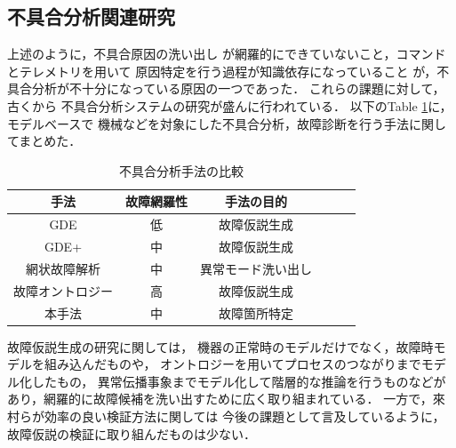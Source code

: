 \documentclass[11pt]{report}
\begin{document}


\subsection{不具合分析関連研究}
上述のように，不具合原因の洗い出し
が網羅的にできていないこと，コマンドとテレメトリを用いて
原因特定を行う過程が知識依存になっていること
が，不具合分析が不十分になっている原因の一つであった．%
これらの課題に対して，古くから%
不具合分析システムの研究が盛んに行われている．
以下のTable \ref{tab:previous_research}に，モデルベースで
機械などを対象にした不具合分析，故障診断を行う手法に関してまとめた．
\begin{table}[H]
   \centering
   \caption{不具合分析手法の比較}
   \label{tab:previous_research}
      \begin{tabular}{cccccc} \hline%
         手法&故障網羅性&手法の目的%
         \\ \hline
         GDE&低&故障仮説生成%
         \\ %
         GDE+\cite{Struss1989}&中&故障仮説生成%
         \\
         網状故障解析\cite{Yamaguchi2014}&中&異常モード洗い出し%
         \\
         故障オントロジー\cite{Kitamura1999}&高&故障仮説生成%
         \\
         本手法&中&故障箇所特定%
         \\ \hline
      \end{tabular}
\end{table}
故障仮説生成の研究に関しては，
機器の正常時のモデルだけでなく，故障時モデルを組み込んだもの\cite{Struss1989}や，
オントロジーを用いてプロセスのつながりまでモデル化したもの\cite{Yamaguchi2014}，
異常伝播事象までモデル化して階層的な推論を行うもの\cite{Kitamura1999}などが
あり，網羅的に故障候補を洗い出すために広く取り組まれている．
一方で，來村ら\cite{Kitamura1999}が効率の良い検証方法に関しては
今後の課題として言及しているように，故障仮説の検証に取り組んだものは少ない．
\end{document}
